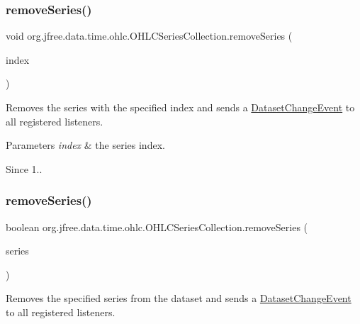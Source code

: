 \subsubsection{\texorpdfstring{remove\+Series()}{removeSeries()}\hspace{0.1cm}{\footnotesize\ttfamily [1/2]}}
{\footnotesize\ttfamily void org.\+jfree.\+data.\+time.\+ohlc.\+O\+H\+L\+C\+Series\+Collection.\+remove\+Series (\begin{DoxyParamCaption}\item[{int}]{index }\end{DoxyParamCaption})}

Removes the series with the specified index and sends a \mbox{\hyperlink{}{Dataset\+Change\+Event}} to all registered listeners.


\begin{DoxyParams}{Parameters}
{\em index} & the series index.\\
\hline
\end{DoxyParams}
\begin{DoxySince}{Since}
1.. 
\end{DoxySince}
\mbox{\label{classorg_1_1jfree_1_1data_1_1time_1_1ohlc_1_1_o_h_l_c_series_collection_a883bedc4da09a6521b90ff7722eff163}} 
\subsubsection{\texorpdfstring{remove\+Series()}{removeSeries()}\hspace{0.1cm}{\footnotesize\ttfamily [2/2]}}
{\footnotesize\ttfamily boolean org.\+jfree.\+data.\+time.\+ohlc.\+O\+H\+L\+C\+Series\+Collection.\+remove\+Series (\begin{DoxyParamCaption}\item[{\mbox{\hyperlink{classorg_1_1jfree_1_1data_1_1time_1_1ohlc_1_1_o_h_l_c_series}{O\+H\+L\+C\+Series}}}]{series }\end{DoxyParamCaption})}

Removes the specified series from the dataset and sends a \mbox{\hyperlink{}{Dataset\+Change\+Event}} to all registered listeners.


